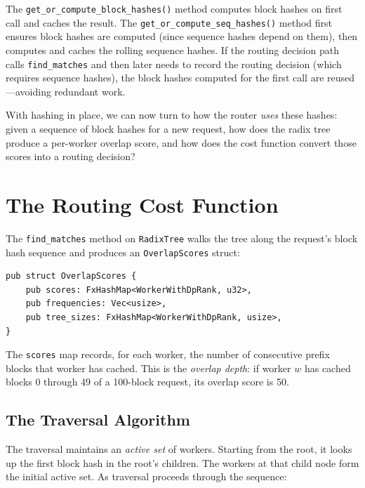 The \texttt{get\_or\_compute\_block\_hashes()} method computes block hashes on first call and caches the result. The \texttt{get\_or\_compute\_seq\_hashes()} method first ensures block hashes are computed (since sequence hashes depend on them), then computes and caches the rolling sequence hashes. If the routing decision path calls \texttt{find\_matches} and then later needs to record the routing decision (which requires sequence hashes), the block hashes computed for the first call are reused---avoiding redundant work.

With hashing in place, we can now turn to how the router \emph{uses} these hashes: given a sequence of block hashes for a new request, how does the radix tree produce a per-worker overlap score, and how does the cost function convert those scores into a routing decision?

\section{The Routing Cost Function}
\label{sec:kvrouter:cost}

The \texttt{find\_matches} method on \texttt{RadixTree} walks the tree along the request's block hash sequence and produces an \texttt{OverlapScores} struct:

\begin{verbatim}
pub struct OverlapScores {
    pub scores: FxHashMap<WorkerWithDpRank, u32>,
    pub frequencies: Vec<usize>,
    pub tree_sizes: FxHashMap<WorkerWithDpRank, usize>,
}
\end{verbatim}

The \texttt{scores} map records, for each worker, the number of consecutive prefix blocks that worker has cached. This is the \emph{overlap depth}: if worker $w$ has cached blocks 0 through 49 of a 100-block request, its overlap score is 50.

\subsection{The Traversal Algorithm}

The traversal maintains an \emph{active set} of workers. Starting from the root, it looks up the first block hash in the root's children. The workers at that child node form the initial active set. As traversal proceeds through the sequence:

